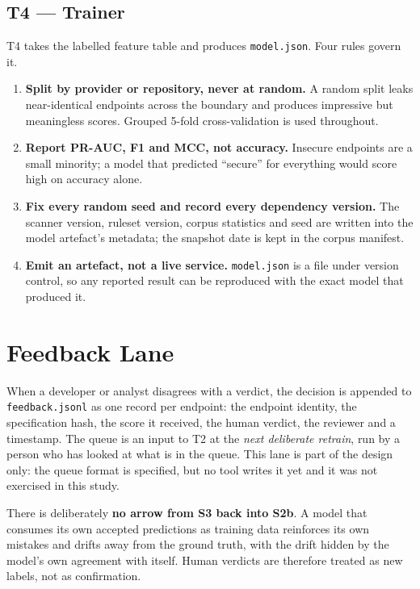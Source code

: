 \documentclass[conference]{IEEEtran}
\begin{document}
\subsection{T4 --- Trainer}
T4 takes the labelled feature table and produces \texttt{model.json}. Four rules govern it.

\begin{enumerate}
\item \textbf{Split by provider or repository, never at random.} A random split leaks
near-identical endpoints across the boundary and produces impressive but meaningless scores.
Grouped 5-fold cross-validation is used throughout.
\item \textbf{Report PR-AUC, F1 and MCC, not accuracy.} Insecure endpoints are a small
minority; a model that predicted ``secure'' for everything would score high on accuracy
alone.
\item \textbf{Fix every random seed and record every dependency version.} The scanner version,
ruleset version, corpus statistics and seed are written into the model artefact's
metadata; the snapshot date is kept in the corpus manifest.
\item \textbf{Emit an artefact, not a live service.} \texttt{model.json} is a file under
version control, so any reported result can be reproduced with the exact model that produced
it.
\end{enumerate}

\section{Feedback Lane}
When a developer or analyst disagrees with a verdict, the decision is appended to
\texttt{feedback.jsonl} as one record per endpoint: the endpoint identity, the specification
hash, the score it received, the human verdict, the reviewer and a timestamp. The queue is an
input to T2 at the \emph{next deliberate retrain}, run by a person who has looked at what is
in the queue. This lane is part of the design only: the queue format is specified, but no tool writes it yet and it was not exercised in this study.

There is deliberately \textbf{no arrow from S3 back into S2b}. A model that consumes its own
accepted predictions as training data reinforces its own mistakes and drifts away from the
ground truth, with the drift hidden by the model's own agreement with itself. Human verdicts
are therefore treated as new labels, not as confirmation.
\end{document}
